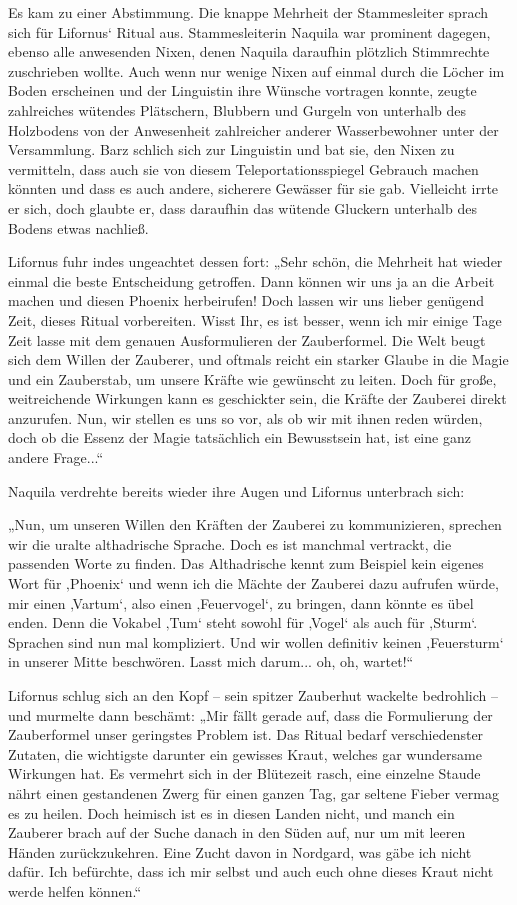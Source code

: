 Es kam zu einer Abstimmung. Die knappe Mehrheit der Stammesleiter sprach sich für Lifornus‘ Ritual aus. Stammesleiterin Naquila war prominent dagegen, ebenso alle anwesenden Nixen, denen Naquila daraufhin plötzlich Stimmrechte zuschrieben wollte. Auch wenn nur wenige Nixen auf einmal durch die Löcher im Boden erscheinen und der Linguistin ihre Wünsche vortragen konnte, zeugte zahlreiches wütendes Plätschern, Blubbern und Gurgeln von unterhalb des Holzbodens von der Anwesenheit zahlreicher anderer Wasserbewohner unter der Versammlung. Barz schlich sich zur Linguistin und bat sie, den Nixen zu vermitteln, dass auch sie von diesem Teleportationsspiegel Gebrauch machen könnten und dass es auch andere, sicherere Gewässer für sie gab. Vielleicht irrte er sich, doch glaubte er, dass daraufhin das wütende Gluckern unterhalb des Bodens etwas nachließ.

Lifornus fuhr indes ungeachtet dessen fort: „Sehr schön, die Mehrheit hat wieder einmal die beste Entscheidung getroffen. Dann können wir uns ja an die Arbeit machen und diesen Phoenix herbeirufen! Doch lassen wir uns lieber genügend Zeit, dieses Ritual vorbereiten. Wisst Ihr, es ist besser, wenn ich mir einige Tage Zeit lasse mit dem genauen Ausformulieren der Zauberformel. Die Welt beugt sich dem Willen der Zauberer, und oftmals reicht ein starker Glaube in die Magie und ein Zauberstab, um unsere Kräfte wie gewünscht zu leiten. Doch für große, weitreichende Wirkungen kann es geschickter sein, die Kräfte der Zauberei direkt anzurufen. Nun, wir stellen es uns so vor, als ob wir mit ihnen reden würden, doch ob die Essenz der Magie tatsächlich ein Bewusstsein hat, ist eine ganz andere Frage...“

Naquila verdrehte bereits wieder ihre Augen und Lifornus unterbrach sich:

„Nun, um unseren Willen den Kräften der Zauberei zu kommunizieren, sprechen wir die uralte althadrische Sprache. Doch es ist manchmal vertrackt, die passenden Worte zu finden. Das Althadrische kennt zum Beispiel kein eigenes Wort für ‚Phoenix‘ und wenn ich die Mächte der Zauberei dazu aufrufen würde, mir einen ‚Vartum‘, also einen ‚Feuervogel‘, zu bringen, dann könnte es übel enden. Denn die Vokabel ‚Tum‘ steht sowohl für ‚Vogel‘ als auch für ‚Sturm‘. Sprachen sind nun mal kompliziert. Und wir wollen definitiv keinen ‚Feuersturm‘ in unserer Mitte beschwören. Lasst mich darum... oh, oh, wartet!“

Lifornus schlug sich an den Kopf – sein spitzer Zauberhut wackelte bedrohlich – und murmelte dann beschämt: „Mir fällt gerade auf, dass die Formulierung der Zauberformel unser geringstes Problem ist. Das Ritual bedarf verschiedenster Zutaten, die wichtigste darunter ein gewisses Kraut, welches gar wundersame Wirkungen hat. Es vermehrt sich in der Blütezeit rasch, eine einzelne Staude nährt einen gestandenen Zwerg für einen ganzen Tag, gar seltene Fieber vermag es zu heilen. Doch heimisch ist es in diesen Landen nicht, und manch ein Zauberer brach auf der Suche danach in den Süden auf, nur um mit leeren Händen zurückzukehren. Eine Zucht davon in Nordgard, was gäbe ich nicht dafür. Ich befürchte, dass ich mir selbst und auch euch ohne dieses Kraut nicht werde helfen können.“

